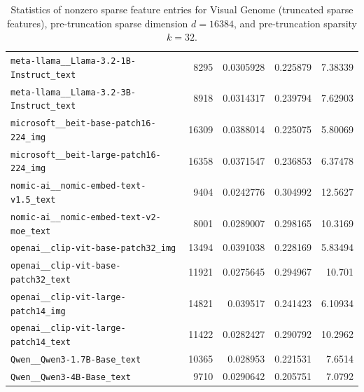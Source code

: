 \begin{table}[htbp]
{\begin{tabular}{lrrrr}
\texttt{meta-llama\_\_Llama-3.2-1B-Instruct\_text} & 8295 & 0.0305928 & 0.225879 & 7.38339 \\
\texttt{meta-llama\_\_Llama-3.2-3B-Instruct\_text} & 8918 & 0.0314317 & 0.239794 & 7.62903 \\
\texttt{microsoft\_\_beit-base-patch16-224\_img} & 16309 & 0.0388014 & 0.225075 & 5.80069 \\
\texttt{microsoft\_\_beit-large-patch16-224\_img} & 16358 & 0.0371547 & 0.236853 & 6.37478 \\
\texttt{nomic-ai\_\_nomic-embed-text-v1.5\_text} & 9404 & 0.0242776 & 0.304992 & 12.5627 \\
\texttt{nomic-ai\_\_nomic-embed-text-v2-moe\_text} & 8001 & 0.0289007 & 0.298165 & 10.3169 \\
\texttt{openai\_\_clip-vit-base-patch32\_img} & 13494 & 0.0391038 & 0.228169 & 5.83494 \\
\texttt{openai\_\_clip-vit-base-patch32\_text} & 11921 & 0.0275645 & 0.294967 & 10.701 \\
\texttt{openai\_\_clip-vit-large-patch14\_img} & 14821 & 0.039517 & 0.241423 & 6.10934 \\
\texttt{openai\_\_clip-vit-large-patch14\_text} & 11422 & 0.0282427 & 0.290792 & 10.2962 \\
\texttt{Qwen\_\_Qwen3-1.7B-Base\_text} & 10365 & 0.028953 & 0.221531 & 7.6514 \\
\texttt{Qwen\_\_Qwen3-4B-Base\_text} & 9710 & 0.0290642 & 0.205751 & 7.0792 \\
\bottomrule
\end{tabular}
}%
\caption{Statistics of nonzero sparse feature entries for Visual Genome (truncated sparse features), pre-truncation sparse dimension $d=16384$, and pre-truncation sparsity $k=32$.}
\label{tab:sparse-feature-entries-visual-genome-truncated-d16384-k32}
\end{table}
